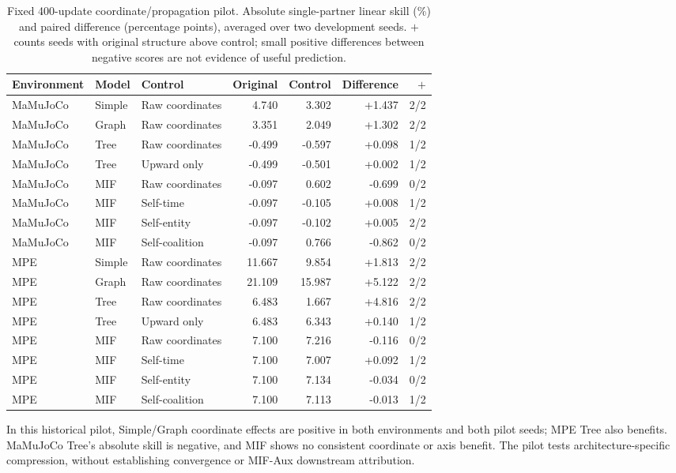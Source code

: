 \begin{table}[!htbp]\centering
\centering\small
\setlength{\tabcolsep}{4pt}
\caption{Fixed 400-update coordinate/propagation pilot. Absolute single-partner linear skill (\%) and paired difference (percentage points), averaged over two development seeds. $+$ counts seeds with original structure above control; small positive differences between negative scores are not evidence of useful prediction.}
\label{tab:coordinatepilot}
\begin{tabular}{lllrrrr}\toprule
Environment & Model & Control & Original & Control & Difference & $+$\\\midrule
MaMuJoCo & Simple & Raw coordinates & 4.740 & 3.302 & +1.437 & 2/2\\
MaMuJoCo & Graph & Raw coordinates & 3.351 & 2.049 & +1.302 & 2/2\\
MaMuJoCo & Tree & Raw coordinates & -0.499 & -0.597 & +0.098 & 1/2\\
MaMuJoCo & Tree & Upward only & -0.499 & -0.501 & +0.002 & 1/2\\
MaMuJoCo & MIF & Raw coordinates & -0.097 & 0.602 & -0.699 & 0/2\\
MaMuJoCo & MIF & Self-time & -0.097 & -0.105 & +0.008 & 1/2\\
MaMuJoCo & MIF & Self-entity & -0.097 & -0.102 & +0.005 & 2/2\\
MaMuJoCo & MIF & Self-coalition & -0.097 & 0.766 & -0.862 & 0/2\\
MPE & Simple & Raw coordinates & 11.667 & 9.854 & +1.813 & 2/2\\
MPE & Graph & Raw coordinates & 21.109 & 15.987 & +5.122 & 2/2\\
MPE & Tree & Raw coordinates & 6.483 & 1.667 & +4.816 & 2/2\\
MPE & Tree & Upward only & 6.483 & 6.343 & +0.140 & 1/2\\
MPE & MIF & Raw coordinates & 7.100 & 7.216 & -0.116 & 0/2\\
MPE & MIF & Self-time & 7.100 & 7.007 & +0.092 & 1/2\\
MPE & MIF & Self-entity & 7.100 & 7.134 & -0.034 & 0/2\\
MPE & MIF & Self-coalition & 7.100 & 7.113 & -0.013 & 1/2\\
\bottomrule\end{tabular}
\end{table}


In this historical pilot, Simple/Graph coordinate effects are positive in both environments
and both pilot seeds; MPE Tree also benefits. MaMuJoCo Tree's absolute
skill is negative, and MIF shows no consistent coordinate or axis
benefit. The pilot tests architecture-specific compression, without
establishing convergence or MIF-Aux downstream attribution.

